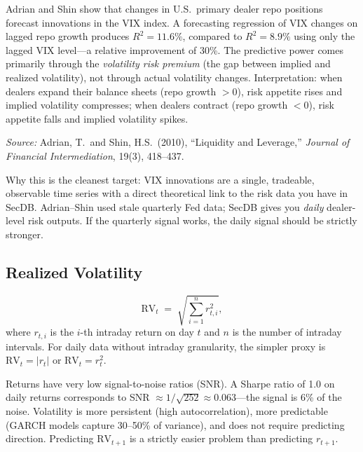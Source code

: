 \begin{keyresult}
Adrian and Shin show that changes in U.S.\ primary dealer repo positions
forecast innovations in the VIX index.
A forecasting regression of VIX changes on lagged repo growth produces
$R^2 = 11.6\%$, compared to $R^2 = 8.9\%$ using only the lagged VIX
level---a relative improvement of 30\%.
The predictive power comes primarily through the \emph{volatility risk
premium} (the gap between implied and realized volatility), not through
actual volatility changes.
Interpretation: when dealers expand their balance sheets
(repo growth $> 0$), risk appetite rises and implied volatility
compresses; when dealers contract (repo growth $< 0$), risk appetite
falls and implied volatility spikes.

\medskip
\noindent
\textit{Source:} Adrian, T.\ and Shin, H.S.\ (2010),
``Liquidity and Leverage,''
\textit{Journal of Financial Intermediation}, 19(3), 418--437.
\end{keyresult}

Why this is the cleanest target: VIX innovations are a single,
tradeable, observable time series with a direct theoretical link to
the risk data you have in SecDB.
Adrian--Shin used stale quarterly Fed data; SecDB gives you \emph{daily}
dealer-level risk outputs.
If the quarterly signal works, the daily signal should be strictly
stronger.

\subsection{Realized Volatility}

\begin{definition}
\begin{equation}
\label{eq:realized-vol}
\text{RV}_t \;=\; \sqrt{\sum_{i=1}^{n} r_{t,i}^2},
\end{equation}
where $r_{t,i}$ is the $i$-th intraday return on day $t$ and $n$ is
the number of intraday intervals.
For daily data without intraday granularity, the simpler proxy is
$\text{RV}_t = |r_t|$ or $\text{RV}_t = r_t^2$.
\end{definition}

\begin{prereq}
Returns have very low signal-to-noise ratios (SNR).
A Sharpe ratio of 1.0 on daily returns corresponds to SNR $\approx
1/\sqrt{252} \approx 0.063$---the signal is 6\% of the noise.
Volatility is more persistent (high autocorrelation), more
predictable (GARCH models capture 30--50\% of variance), and
does not require predicting direction.
Predicting $\text{RV}_{t+1}$ is a strictly easier problem than
predicting $r_{t+1}$.
\end{prereq}

